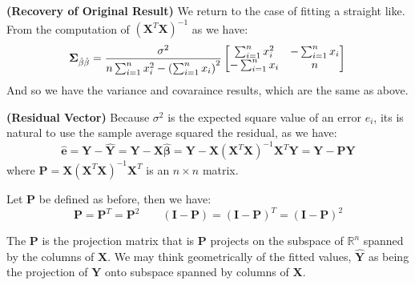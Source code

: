 \begin{remark}{\textbf{(Recovery of Original Result)}}
    We return to the case of fitting a straight like. From the computation of $(\boldsymbol X^T\boldsymbol X)^{-1}$ as we have:
    \begin{equation*}
        \boldsymbol \Sigma_{\hat{\beta}\hat{\beta}} =  \frac{\sigma^2}{n\sum^n_{i=1}x_i^2 - \left( \sum^n_{i=1}x_i \right)^2} 
        \begin{bmatrix}
            \sum^n_{i=1}x_i^2 & -\sum^n_{i=1}x_i \\
            -\sum^n_{i=1}x_i & n 
        \end{bmatrix} \\
    \end{equation*}
    And so we have the variance and covaraince results, which are the same as above.
\end{remark}

\begin{remark}{\textbf{(Residual Vector)}}
    Because $\sigma^2$ is the expected square value of an error $e_i$, its is natural to use the sample average squared the residual, as we have:
    \begin{equation*}
        \hat{\boldsymbol e} = \boldsymbol Y - \hat{\boldsymbol Y} = \boldsymbol Y - \boldsymbol X\hat{\boldsymbol \beta} = \boldsymbol Y - \boldsymbol X(\boldsymbol X^T\boldsymbol X)^{-1}\boldsymbol X^T\boldsymbol Y = \boldsymbol Y - \boldsymbol P\boldsymbol Y
    \end{equation*}
    where $\boldsymbol P = \boldsymbol X(\boldsymbol X^T\boldsymbol X)^{-1}\boldsymbol X^T$ is an $n\times n$ matrix. 
\end{remark}

\begin{lemma}
    Let $\boldsymbol P$ be defined as before, then we have:
    \begin{equation*}
        \boldsymbol P = \boldsymbol P^T = \boldsymbol P^2 \qquad (\boldsymbol I - \boldsymbol P) = (\boldsymbol I - \boldsymbol P)^T = (\boldsymbol I - \boldsymbol P)^2
    \end{equation*}
\end{lemma}

\begin{remark}
    The $\boldsymbol P$ is the projection matrix that is $\boldsymbol P$ projects on the subspace of $\mathbb{R}^n$ spanned by the columns of $\boldsymbol X$. We may think geometrically of the fitted values, $\hat{\boldsymbol Y}$ as being the projection of $\boldsymbol Y$ onto subspace spanned by columns of $\boldsymbol X$.
\end{remark}

